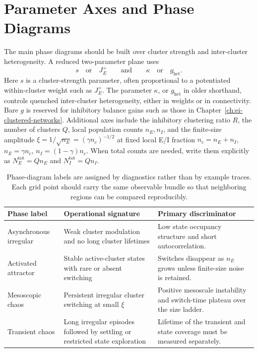 \section{Parameter Axes and Phase Diagrams}
\label{sec:ch10-phase-diagrams}

The main phase diagrams should be built over cluster strength and inter-cluster
heterogeneity. A reduced two-parameter plane uses
\begin{equation}
    s \quad \text{or} \quad J_E^+
    \qquad \text{and} \qquad
    \kappa \quad \text{or} \quad g_{\mathrm{het}} .
    \label{eq:ch10-phase-axes}
\end{equation}
Here \(s\) is a cluster-strength parameter, often proportional to a potentiated
within-cluster weight such as \(J_E^+\). The parameter \(\kappa\), or
\(g_{\mathrm{het}}\) in older shorthand, controls quenched inter-cluster
heterogeneity, either in weights or in connectivity. Bare \(g\) is reserved for
inhibitory balance gains such as those in Chapter~\ref{ch:ei-clustered-networks}.
Additional axes include the inhibitory clustering ratio \(R\), the number of
clusters \(Q\), local population counts \(n_E,n_I\), and the finite-size
amplitude \(\xi=1/\sqrt{n_E}=(\gamma n_c)^{-1/2}\) at fixed local E/I fraction
\(n_c=n_E+n_I\), \(n_E=\gamma n_c\), \(n_I=(1-\gamma)n_c\). When total counts
are needed, write them explicitly as \(N_E^{\mathrm{tot}}=Qn_E\) and
\(N_I^{\mathrm{tot}}=Qn_I\).

\begin{table}[t]
\centering
\small
\begin{tabularx}{\textwidth}{@{}p{}p{}X@{}}
\toprule
\textbf{Phase label} & \textbf{Operational signature} & \textbf{Primary discriminator} \\
\midrule
Asynchronous irregular & Weak cluster modulation and no long cluster lifetimes & Low state occupancy structure and short autocorrelation. \\
Activated attractor & Stable active-cluster states with rare or absent switching & Switches disappear as \(n_E\) grows unless finite-size noise is retained. \\
Mesoscopic chaos & Persistent irregular cluster switching at small \(\xi\) & Positive mesoscale instability and switch-time plateau over the size ladder. \\
Transient chaos & Long irregular episodes followed by settling or restricted state exploration & Lifetime of the transient and state coverage must be measured separately. \\
\bottomrule
\end{tabularx}
\caption{Phase-diagram labels are assigned by diagnostics rather than by
example traces. Each grid point should carry the same observable bundle so that
neighboring regions can be compared reproducibly.}
\label{tab:ch10-phase-diagram}
\end{table}

